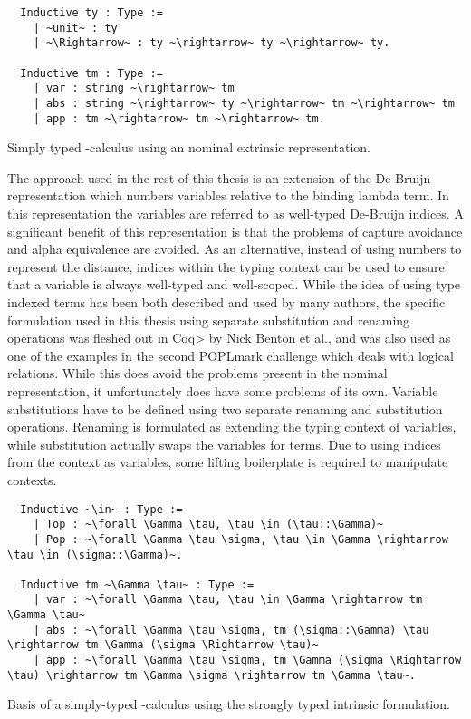 \begin{listing}[h]
  \begin{verbatim}
  Inductive ty : Type :=
    | ~unit~ : ty
    | ~\Rightarrow~ : ty ~\rightarrow~ ty ~\rightarrow~ ty.

  Inductive tm : Type :=
    | var : string ~\rightarrow~ tm
    | abs : string ~\rightarrow~ ty ~\rightarrow~ tm ~\rightarrow~ tm
    | app : tm ~\rightarrow~ tm ~\rightarrow~ tm.
  \end{verbatim}
  \caption{Simply typed \lambda-calculus using an nominal extrinsic representation.}
  \label{lst:nominal_stlc}
\end{listing}

The approach used in the rest of this thesis is an extension of the De-Bruijn representation which numbers variables relative to the binding lambda term.
In this representation the variables are referred to as well-typed De-Bruijn indices.
A significant benefit of this representation is that the problems of capture avoidance and alpha equivalence are avoided.
As an alternative, instead of using numbers to represent the distance, indices within the typing context can be used to ensure that a variable is always well-typed and well-scoped.
While the idea of using type indexed terms has been both described and used by many authors\cite{Altenkirch99}\cite{McBride04}\cite{Adams06}, the specific formulation used in this thesis using separate substitution and renaming operations was fleshed out in \<Coq> by Nick Benton et al.\cite{Benton2011}, and was also used as one of the examples in the second POPLmark challenge which deals with logical relations\cite{poplmark_reloaded}.
While this does avoid the problems present in the nominal representation, it unfortunately does have some problems of its own.
Variable substitutions have to be defined using two separate renaming and substitution operations.
Renaming is formulated as extending the typing context of variables, while substitution actually swaps the variables for terms.
Due to using indices from the context as variables, some lifting boilerplate is required to manipulate contexts.

\begin{listing}[h]
  \begin{verbatim}
  Inductive ~\in~ : Type :=
    | Top : ~\forall \Gamma \tau, \tau \in (\tau::\Gamma)~
    | Pop : ~\forall \Gamma \tau \sigma, \tau \in \Gamma \rightarrow \tau \in (\sigma::\Gamma)~.

  Inductive tm ~\Gamma \tau~ : Type :=
    | var : ~\forall \Gamma \tau, \tau \in \Gamma \rightarrow tm \Gamma \tau~
    | abs : ~\forall \Gamma \tau \sigma, tm (\sigma::\Gamma) \tau \rightarrow tm \Gamma (\sigma \Rightarrow \tau)~
    | app : ~\forall \Gamma \tau \sigma, tm \Gamma (\sigma \Rightarrow \tau) \rightarrow tm \Gamma \sigma \rightarrow tm \Gamma \tau~.
  \end{verbatim}
  \caption{Basis of a simply-typed \lambda-calculus using the strongly typed intrinsic formulation.}
  \label{lst:strong_stlc}
\end{listing}
